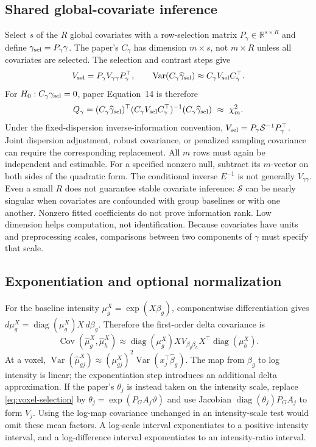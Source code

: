 \documentclass[11pt,a4paper]{article}
\newcommand{\R}{\mathbb R}
\newcommand{\Var}{\operatorname{Var}}
\newcommand{\Cov}{\operatorname{Cov}}
\newcommand{\diag}{\operatorname{diag}}
\numberwithin{equation}{section}
\begin{document}
\subsection{Shared global-covariate inference}
Select $s$ of the $R$ global covariates with a row-selection matrix
$P_\gamma\in\R^{s\times R}$ and define
$\gamma_{\rm sel}=P_\gamma\gamma$.
The paper's $C_\gamma$ has dimension $m\times s$, not
$m\times R$ unless all covariates are selected.
The selection and contrast steps give
\[
 V_{\rm sel}=P_\gamma V_{\gamma\gamma}P_\gamma^\top,\qquad
 \Var(C_\gamma\widehat\gamma_{\rm sel})
       \approx C_\gamma V_{\rm sel} C_\gamma^\top .
\]
For $H_0:C_\gamma\gamma_{\rm sel}=0$, paper Equation~14 is therefore
\begin{equation}
 Q_\gamma=(C_\gamma\widehat\gamma_{\rm sel})^\top
       (C_\gamma V_{\rm sel}C_\gamma^\top)^{-1}
       (C_\gamma\widehat\gamma_{\rm sel})\ \approx\ \chi_m^2 .
\end{equation}
Under the fixed-dispersion inverse-information convention,
$V_{\rm sel}=P_\gamma\mathcal S^{-1}P_\gamma^\top$.
Joint dispersion adjustment, robust covariance, or penalized sampling
covariance can require the corresponding replacement.
All $m$ rows must again be independent and estimable.
For a specified nonzero null, subtract its $m$-vector on both sides
of the quadratic form.
The conditional inverse $E^{-1}$ is not generally $V_{\gamma\gamma}$.
Even a small $R$ does not guarantee stable covariate inference:
${\mathcal S}$ can be nearly singular when covariates are confounded with group
baselines or with one another. Nonzero fitted coefficients do not prove
information rank. Low dimension helps computation, not identification.
Because covariates have units and preprocessing scales, comparisons
between two components of $\gamma$ must specify that scale.

\subsection{Exponentiation and optional normalization}
For the baseline intensity $\mu_g^X=\exp(X\beta_g)$, componentwise differentiation
gives $d\mu_g^X=\diag(\mu_g^X)X\,d\beta_g$.
Therefore the first-order delta covariance is
\begin{equation}
 \Cov(\widehat \mu_g^X,\widehat \mu_h^X)
 \approx \diag(\mu_g^X)X V_{\beta_g\beta_h}X^\top\diag(\mu_h^X).
 \label{eq:exp-delta}
\end{equation}
At a voxel, $\Var(\widehat \mu_{gj}^X)\approx
(\mu_{gj}^X)^2\Var(x_j^\top\widehat\beta_g)$.
The map from $\beta_g$ to log intensity is linear; the exponentiation step
introduces an additional delta approximation.
If the paper's $\theta_j$ is instead taken on the intensity scale,
replace \eqref{eq:voxel-selection} by
$\theta_j=\exp(P_GA_j\vartheta)$ and use Jacobian
$\diag(\theta_j)P_GA_j$ to form $V_j$.
Using the log-map covariance unchanged in an intensity-scale test
would omit these mean factors.
A log-scale interval exponentiates to a positive intensity interval,
and a log-difference interval exponentiates to an intensity-ratio interval.
\end{document}
